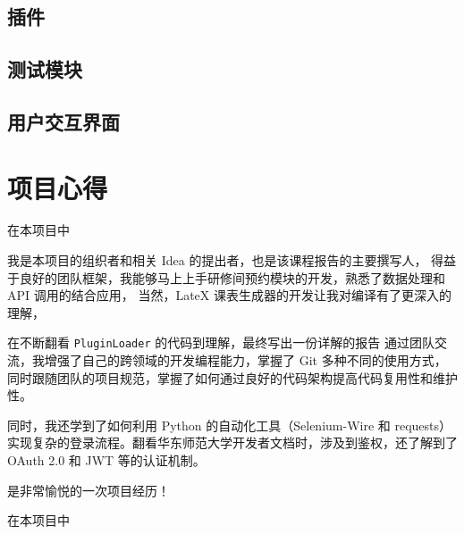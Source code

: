 \documentclass[14pt,a4paper,UTF8,twoside]{article}
\begin{document}
    \subsection{插件}\label{subsec:plugins}
    
    
    

    \subsection{测试模块}\label{subsec:tests}
    

    \subsection{用户交互界面}\label{subsec:gui}
    

    \section{项目心得}\label{sec:thoughts}

    \begin{Thought}[关卓谦]
        在本项目中
    \end{Thought}

    \begin{Thought}[张梓卫]
        我是本项目的组织者和相关 Idea 的提出者，也是该课程报告的主要撰写人，
        得益于良好的团队框架，我能够马上上手研修间预约模块的开发，熟悉了数据处理和 API 调用的结合应用，
        当然，LateX 课表生成器的开发让我对编译有了更深入的理解，

        \vspace{0.3cm}

        在不断翻看 \verb`PluginLoader` 的代码到理解，最终写出一份详解的报告
        通过团队交流，我增强了自己的跨领域的开发编程能力，掌握了 Git 多种不同的使用方式，
        同时跟随团队的项目规范，掌握了如何通过良好的代码架构提高代码复用性和维护性。

        \vspace{0.3cm}

        同时，我还学到了如何利用 Python 的自动化工具（Selenium-Wire 和 requests）
        实现复杂的登录流程。翻看华东师范大学开发者文档时，涉及到鉴权，还了解到了 OAuth 2.0 和 JWT 等的认证机制。

        \vspace{0.3cm}

        是非常愉悦的一次项目经历！
    \end{Thought}

    \begin{Thought}[王文锦]
        在本项目中
    \end{Thought}
\end{document}
